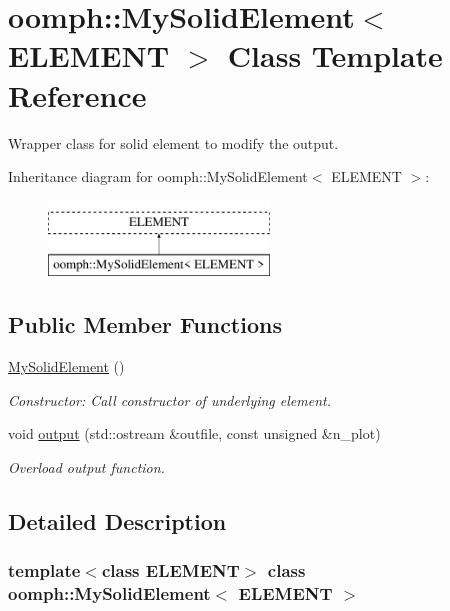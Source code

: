 \hypertarget{classoomph_1_1MySolidElement}{}\section{oomph\+:\+:My\+Solid\+Element$<$ E\+L\+E\+M\+E\+NT $>$ Class Template Reference}
\label{classoomph_1_1MySolidElement}


Wrapper class for solid element to modify the output.  


Inheritance diagram for oomph\+:\+:My\+Solid\+Element$<$ E\+L\+E\+M\+E\+NT $>$\+:\begin{figure}[H]
\begin{center}
\leavevmode
\includegraphics[height=2.000000cm]{classoomph_1_1MySolidElement}
\end{center}
\end{figure}
\subsection*{Public Member Functions}
\begin{DoxyCompactItemize}
\item 
\hyperlink{classoomph_1_1MySolidElement_afe8a392ac0bed5890f64b75adea8f5af}{My\+Solid\+Element} ()
\begin{DoxyCompactList}\small\item\em Constructor\+: Call constructor of underlying element. \end{DoxyCompactList}\item 
void \hyperlink{classoomph_1_1MySolidElement_abf5b903419201b1fd6f1587749337650}{output} (std\+::ostream \&outfile, const unsigned \&n\+\_\+plot)
\begin{DoxyCompactList}\small\item\em Overload output function. \end{DoxyCompactList}\end{DoxyCompactItemize}


\subsection{Detailed Description}
\subsubsection*{template$<$class E\+L\+E\+M\+E\+NT$>$\newline
class oomph\+::\+My\+Solid\+Element$<$ E\+L\+E\+M\+E\+N\+T $>$}

